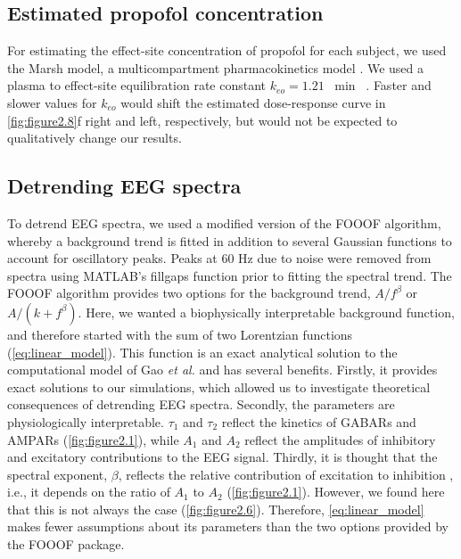 \subsection{Estimated propofol concentration}
For estimating the effect-site concentration of propofol for each subject, we used the Marsh model, a multicompartment pharmacokinetics model \cite{Marsh1991}. We used a plasma to effect-site equilibration rate constant $k_{eo}=1.21$ \unit{\per\minute} ~\cite{Struys2000}. Faster and slower values for $k_{eo}$ would shift the estimated dose-response curve in \autoref{fig:figure2.8}f right and left, respectively, but would not be expected to qualitatively change our results.

\subsection{Detrending EEG spectra}
To detrend EEG spectra, we used a modified version of the FOOOF algorithm\cite{Donoghue2020}, whereby a background trend is fitted in addition to several Gaussian functions to account for oscillatory peaks. Peaks at 60 \unit{\hertz} due to noise were removed from spectra using MATLAB’s fillgaps function prior to fitting the spectral trend. The FOOOF algorithm provides two options for the background trend, $A/f^\beta$ or $A/\left(k+f^\beta\right)$. Here, we wanted a biophysically interpretable background function, and therefore started with the sum of two Lorentzian functions (\ref{eq:linear_model}). This function is an exact analytical solution to the computational model of Gao \textit{et al.} \cite{Gao2017} and has several benefits. Firstly, it provides exact solutions to our simulations, which allowed us to investigate theoretical consequences of detrending EEG spectra. Secondly, the parameters are physiologically interpretable. $\tau_1$ and $\tau_2$ reflect the kinetics of GABARs and AMPARs (\autoref{fig:figure2.1}), while $A_1$ and $A_2$ reflect the amplitudes of inhibitory and excitatory contributions to the EEG signal. Thirdly, it is thought that the spectral exponent, $\beta$, reflects the relative contribution of excitation to inhibition \cite{Gao2017}, i.e., it depends on the ratio of $A_1$ to $A_2$ (\autoref{fig:figure2.1}). However, we found here that this is not always the case (\autoref{fig:figure2.6}). Therefore, \ref{eq:linear_model} makes fewer assumptions about its parameters than the two options provided by the FOOOF package.


